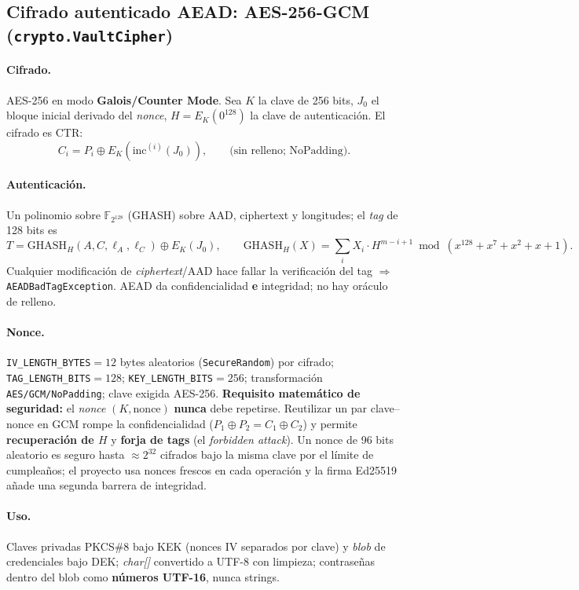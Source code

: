 \documentclass[11pt,a4paper]{article}
\begin{document}
\subsection{Cifrado autenticado AEAD: AES-256-GCM (\texttt{crypto.VaultCipher})}
\paragraph{Cifrado.} AES-256 en modo \textbf{Galois/Counter Mode}. Sea $K$ la
clave de 256 bits, $J_0$ el bloque inicial derivado del \emph{nonce}, $H = E_K(0^{128})$
la clave de autenticación. El cifrado es CTR:
\[
  C_i = P_i \oplus E_K(\text{inc}^{(i)}(J_0)),\qquad \text{(sin relleno; NoPadding)}.
\]
\paragraph{Autenticación.} Un polinomio sobre $\mathbb{F}_{2^{128}}$ (GHASH) sobre
AAD, ciphertext y longitudes; el \emph{tag} de 128 bits es
\[
  T = \text{GHASH}_H(A, C, \ell_A, \ell_C) \oplus E_K(J_0),
  \qquad \text{GHASH}_H(X) = \textstyle\sum_i X_i \cdot H^{m-i+1} \bmod (x^{128}+x^7+x^2+x+1).
\]
Cualquier modificación de \emph{ciphertext}/AAD hace fallar la verificación del
tag $\Rightarrow$ \texttt{AEADBadTagException}. AEAD da confidencialidad
\textbf{e} integridad; no hay oráculo de relleno.
\paragraph{Nonce.} \texttt{IV\_LENGTH\_BYTES}$=12$ bytes aleatorios
(\texttt{SecureRandom}) por cifrado; \texttt{TAG\_LENGTH\_BITS}$=128$;
\texttt{KEY\_LENGTH\_BITS}$=256$; transformación \texttt{AES/GCM/NoPadding};
clave exigida AES-256. \textbf{Requisito matemático de seguridad:} el \emph{nonce}
$(K, \text{nonce})$ \textbf{nunca} debe repetirse. Reutilizar un par
clave--nonce en GCM rompe la confidencialidad ($P_1 \oplus P_2 = C_1 \oplus C_2$)
y permite \textbf{recuperación de $H$} y \textbf{forja de tags} (el \emph{forbidden
attack}). Un nonce de 96 bits aleatorio es seguro hasta $\approx 2^{32}$ cifrados
bajo la misma clave por el límite de cumpleaños; el proyecto usa nonces frescos
en cada operación y la firma Ed25519 añade una segunda barrera de integridad.
\paragraph{Uso.} Claves privadas PKCS\#8 bajo KEK (nonces IV separados por clave)
y \emph{blob} de credenciales bajo DEK; \emph{char[]} convertido a UTF-8 con
limpieza; contraseñas dentro del blob como \textbf{números UTF-16}, nunca strings.
\end{document}
